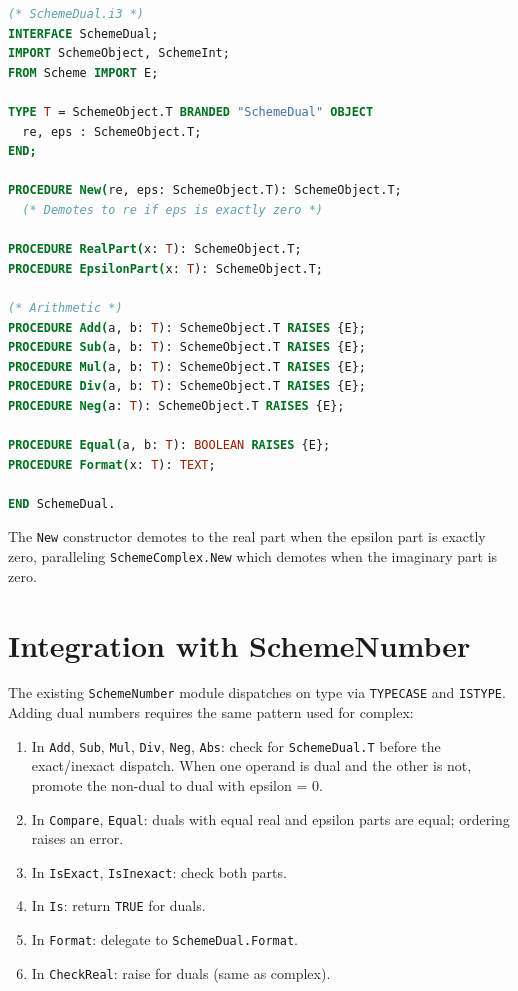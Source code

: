 \documentclass[12pt]{report}
\begin{document}
\begin{lstlisting}[language=Modula3]
(* SchemeDual.i3 *)
INTERFACE SchemeDual;
IMPORT SchemeObject, SchemeInt;
FROM Scheme IMPORT E;

TYPE T = SchemeObject.T BRANDED "SchemeDual" OBJECT
  re, eps : SchemeObject.T;
END;

PROCEDURE New(re, eps: SchemeObject.T): SchemeObject.T;
  (* Demotes to re if eps is exactly zero *)

PROCEDURE RealPart(x: T): SchemeObject.T;
PROCEDURE EpsilonPart(x: T): SchemeObject.T;

(* Arithmetic *)
PROCEDURE Add(a, b: T): SchemeObject.T RAISES {E};
PROCEDURE Sub(a, b: T): SchemeObject.T RAISES {E};
PROCEDURE Mul(a, b: T): SchemeObject.T RAISES {E};
PROCEDURE Div(a, b: T): SchemeObject.T RAISES {E};
PROCEDURE Neg(a: T): SchemeObject.T RAISES {E};

PROCEDURE Equal(a, b: T): BOOLEAN RAISES {E};
PROCEDURE Format(x: T): TEXT;

END SchemeDual.
\end{lstlisting}

The {\tt New} constructor demotes to the real part when the epsilon
part is exactly zero, paralleling {\tt SchemeComplex.New} which
demotes when the imaginary part is zero.

\section{Integration with SchemeNumber}

The existing {\tt SchemeNumber} module dispatches on type via
{\tt TYPECASE} and {\tt ISTYPE}.  Adding dual numbers requires
the same pattern used for complex:

\begin{enumerate}[nosep]
\item In {\tt Add}, {\tt Sub}, {\tt Mul}, {\tt Div}, {\tt Neg},
  {\tt Abs}: check for {\tt SchemeDual.T} before the exact/inexact
  dispatch.  When one operand is dual and the other is not,
  promote the non-dual to dual with epsilon = 0.
\item In {\tt Compare}, {\tt Equal}: duals with equal real and
  epsilon parts are equal; ordering raises an error.
\item In {\tt IsExact}, {\tt IsInexact}: check both parts.
\item In {\tt Is}: return {\tt TRUE} for duals.
\item In {\tt Format}: delegate to {\tt SchemeDual.Format}.
\item In {\tt CheckReal}: raise for duals (same as complex).
\end{enumerate}
\end{document}
